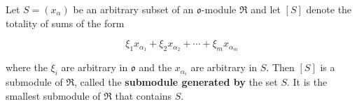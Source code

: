 Let $S = (x_\alpha)$ be an arbitrary subset of an $\mathfrak{o}$-module $\mathfrak{R}$ and let $[S]$ denote the totality of sums of the form

$$
\xi_1 x_{\alpha_1} + \xi_2 x_{\alpha_2} + \cdots + \xi_m x_{\alpha_m}
$$

where the $\xi_i$ are arbitrary in $\mathfrak{o}$ and the $x_{\alpha_i}$ are arbitrary in $S$. Then $[S]$ is a submodule of $\mathfrak{R}$, called the \textbf{submodule generated by} the set $S$. It is the smallest submodule of $\mathfrak{R}$ that contains $S$.
